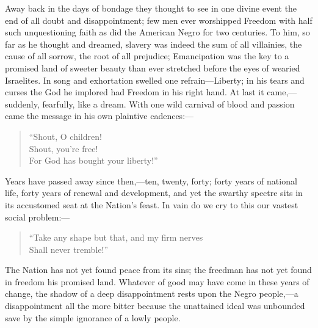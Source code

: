 Away back in the days of bondage they thought to see in one divine
event the end of all doubt and disappointment; few men ever worshipped
Freedom with half such unquestioning faith as did the American Negro
for two centuries. To him, so far as he thought and dreamed, slavery
was indeed the sum of all villainies, the cause of all sorrow, the
root of all  prejudice; Emancipation was the key to a promised
land of sweeter beauty than ever stretched before the eyes of wearied
Israelites. In song and exhortation swelled one refrain---Liberty; in
his tears and curses the God he implored had Freedom in his right
hand. At last it came,---suddenly, fearfully, like a dream. With one
wild carnival of blood and passion came the message in his own
plaintive cadences:---

\begin{verse}
``Shout, O children!\\
Shout, you're free!\\
For God has bought your liberty!''
\end{verse}

Years have passed away since then,---ten, twenty, forty; forty years
of national life, forty years of renewal and development, and yet the
swarthy spectre sits in its accustomed seat at the Nation's feast. In
vain do we cry to this our vastest social problem:---

\begin{verse}
``Take any shape but that, and my firm nerves\\
Shall never tremble!''
\end{verse}

The Nation has not yet found peace from its sins; the freedman has not
yet found in freedom his promised land. Whatever of good may have come
in these years of change, the shadow of a deep disappointment rests
upon the Negro people,---a disappointment all the more bitter because
the unattained ideal was unbounded save by the simple ignorance of a
lowly people.

